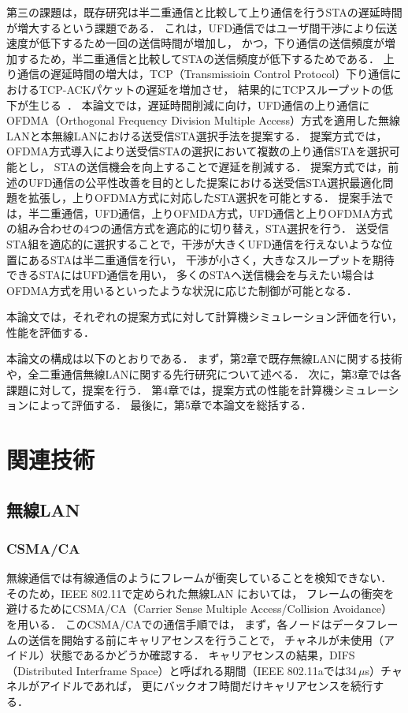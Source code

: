 \documentclass[master]{kuisthesis}		%
\begin{document}
\par
第三の課題は，既存研究は半二重通信と比較して上り通信を行うSTAの遅延時間が増大するという課題である．
これは，UFD通信ではユーザ間干渉により伝送速度が低下するため一回の送信時間が増加し，
かつ，下り通信の送信頻度が増加するため，半二重通信と比較してSTAの送信頻度が低下するためである．
上り通信の遅延時間の増大は，TCP（Transmissioin Control Protocol）下り通信におけるTCP-ACKパケットの遅延を増加させ，
結果的にTCPスループットの低下が生じる~\cite{rtt}．
本論文では，遅延時間削減に向け，UFD通信の上り通信にOFDMA（Orthogonal Frequency Division Multiple Access）方式を適用した無線LANと本無線LANにおける送受信STA選択手法を提案する．
提案方式では，OFDMA方式導入により送受信STAの選択において複数の上り通信STAを選択可能とし，
STAの送信機会を向上することで遅延を削減する．
提案方式では，前述のUFD通信の公平性改善を目的とした提案における送受信STA選択最適化問題を拡張し，上りOFDMA方式に対応したSTA選択を可能とする．
提案手法では，半二重通信，UFD通信，上りOFMDA方式，UFD通信と上りOFDMA方式の組み合わせの4つの通信方式を適応的に切り替え，STA選択を行う．
送受信STA組を適応的に選択することで，干渉が大きくUFD通信を行えないような位置にあるSTAは半二重通信を行い，
干渉が小さく，大きなスループットを期待できるSTAにはUFD通信を用い，
多くのSTAへ送信機会を与えたい場合はOFDMA方式を用いるといったような状況に応じた制御が可能となる．
\par
本論文では，それぞれの提案方式に対して計算機シミュレーション評価を行い，性能を評価する．
\par
本論文の構成は以下のとおりである．
まず，第2章で既存無線LANに関する技術や，全二重通信無線LANに関する先行研究について述べる．
次に，第3章では各課題に対して，提案を行う．
第4章では，提案方式の性能を計算機シミュレーションによって評価する．
最後に，第5章で本論文を総括する．

\section{関連技術}
	\subsection{無線LAN}
		\subsubsection{CSMA/CA}
			無線通信では有線通信のようにフレームが衝突していることを検知できない．
			そのため，{IEEE} 802.11で定められた無線LAN においては，
			フレームの衝突を避けるためにCSMA/CA（Carrier Sense Multiple Access/Collision Avoidance）を用いる\cite{mori}．
			このCSMA/CAでの通信手順では，
			まず，各ノードはデータフレームの送信を開始する前にキャリアセンスを行うことで，
			チャネルが未使用（アイドル）状態であるかどうか確認する．
			キャリアセンスの結果，DIFS（Distributed Interframe Space）と呼ばれる期間（IEEE 802.11aでは34\,$\mu$s）チャネルがアイドルであれば，
			更にバックオフ時間だけキャリアセンスを続行する．
\end{document}
